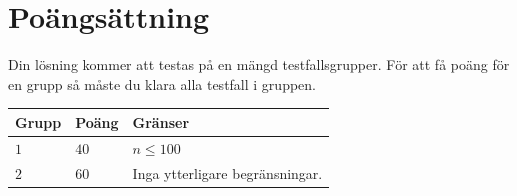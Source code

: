 \section*{Poängsättning}
Din lösning kommer att testas på en mängd testfallsgrupper.
För att få poäng för en grupp så måste du klara alla testfall i gruppen.

\noindent
\begin{tabular}{| l | l | p{12cm} |}
  \hline
  \textbf{Grupp} & \textbf{Poäng} & \textbf{Gränser} \\ \hline
  $1$    & $40$        & $n \leq 100$ \\ \hline
  $2$    & $60$        & Inga ytterligare begränsningar.  \\ \hline
\end{tabular}

